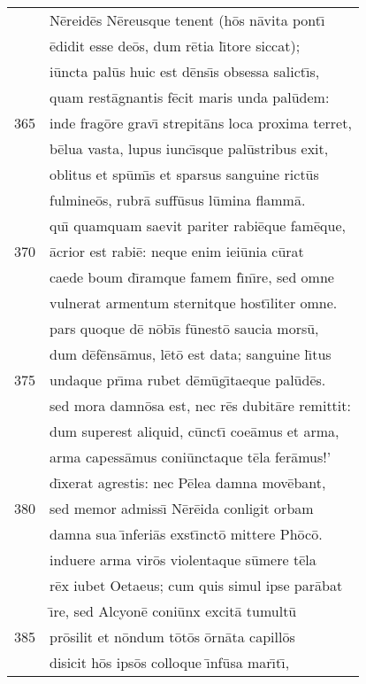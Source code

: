 \documentclass[paper=6in:9in,pagesize=pdftex,
               headinclude=on,footinclude=on,12pt]{scrbook}
\begin{document}
\begin{longtable}[p]{ r l }
 & N\=ereid\=es N\=ereusque tenent (h\=os n\=avita pont\={\i}\\ 
 & \=edidit esse de\=os, dum r\=etia l\={\i}tore siccat);\\ 
 & i\=uncta pal\=us huic est d\=ens\={\i}s obsessa salict\={\i}s,\\ 
 & quam rest\=agnantis f\=ecit maris unda pal\=udem:\\ 
365 & inde frag\=ore grav\={\i} strepit\=ans loca proxima terret,\\ 
 & b\=elua vasta, lupus iunc\={\i}sque pal\=ustribus exit,\\ 
 & oblitus et sp\=um\={\i}s et sparsus sanguine rict\=us\\ 
 & fulmine\=os, rubr\=a suff\=usus l\=umina flamm\=a.\\ 
 & qu\={\i} quamquam saevit pariter rabi\=eque fam\=eque,\\ 
370 & \=acrior est rabi\=e: neque enim iei\=unia c\=urat\\ 
 & caede boum d\={\i}ramque famem f\={\i}n\={\i}re, sed omne\\ 
 & vulnerat armentum sternitque host\={\i}liter omne.\\ 
 & pars quoque d\=e n\=ob\={\i}s f\=unest\=o saucia mors\=u,\\ 
 & dum d\=ef\=ens\=amus, l\=et\=o est data; sanguine l\={\i}tus\\ 
375 & undaque pr\={\i}ma rubet d\=em\=ug\={\i}taeque pal\=ud\=es.\\ 
 & sed mora damn\=osa est, nec r\=es dubit\=are remittit:\\ 
 & dum superest aliquid, c\=unct\={\i} coe\=amus et arma,\\ 
 & arma capess\=amus coni\=unctaque t\=ela fer\=amus!'\\ 
 & d\={\i}xerat agrestis: nec P\=elea damna mov\=ebant,\\ 
380 & sed memor admiss\={\i} N\=er\=eida conligit orbam\\ 
 & damna sua \={\i}nferi\=as exst\={\i}nct\=o mittere Ph\=oc\=o.\\ 
 & induere arma vir\=os violentaque s\=umere t\=ela\\ 
 & r\=ex iubet Oetaeus; cum quis simul ipse par\=abat\\ 
 & \={\i}re, sed Alcyon\=e coni\=unx excit\=a tumult\=u\\ 
385 & pr\=osilit et n\=ondum t\=ot\=os \=orn\=ata capill\=os\\ 
 & disicit h\=os ips\=os colloque \={\i}nf\=usa mar\={\i}t\={\i},\\ 

\end{longtable}
\end{document}
